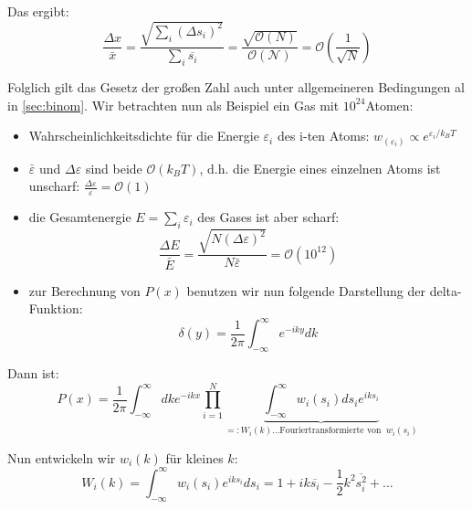 \documentclass[ngerman]{scrartcl}
\begin{document}
	Das ergibt:
	\begin{equation}
		\frac{\Delta x}{\bar{x}}=\frac{\sqrt{\sum_i(\Delta s_i)^2}}{\sum_i \overline{s_i}}=
		\frac{\sqrt{\mathcal{O}(N)}}{\mathcal{O(N)}}=\mathcal{O}\left(\frac{1}{\sqrt{N}}\right)
	\end{equation}
	
	Folglich gilt das Gesetz der großen Zahl auch unter allgemeineren Bedingungen al in \autoref{sec:binom}. Wir betrachten nun als Beispiel ein Gas mit $10^{24}$Atomen:
	\begin{itemize}
		\item Wahrscheinlichkeitsdichte für die Energie $\varepsilon_i$ des i-ten Atoms: $w_(\varepsilon_i) \propto e^{\varepsilon_i / k_B T}$
		\item $\bar{\varepsilon}$ und $\Delta \varepsilon$ sind beide $\mathcal{O}(k_B T)$, d.h. die Energie eines einzelnen Atoms ist unscharf: $\frac{\Delta \varepsilon}{\varepsilon} = \mathcal{O}(1)$
		\item die Gesamtenergie $E=\sum_i \varepsilon_i$ des Gases ist aber scharf: \begin{equation}\frac{\Delta E}{\bar{E}}=\frac{\sqrt{N(\Delta\varepsilon)^2}}{N\bar{\varepsilon}}=\mathcal{O}(10^{12})\end{equation}
		\item zur Berechnung von $P(x)$ benutzen wir nun folgende Darstellung der delta-Funktion:\begin{equation} \delta (y) = \frac{1}{2\pi} \int_{-\infty}^{\infty} e^{-iky}dk \end{equation}
\end{itemize}
	
	Dann ist:
	\begin{equation}
		P(x)=\frac{1}{2\pi}\int_{-\infty}^{\infty}dke^{-ikx} \prod_{i=1}^N \underbrace{\int_{-\infty}^{\infty} w_i(s_i)ds_i e^{iks_i}	}_{=:W_i(k)\dots \text{Fouriertransformierte von }~w_i(s_i)}
	\end{equation}
	
	Nun entwickeln wir $w_i(k)$ für kleines $k$:
	\begin{equation}
		W_i(k)=\int_{-\infty}^{\infty}w_i(s_i)e^{iks_i}ds_i = 1+ ik \overline{s_i} - \frac{1}{2}k^2 \overline{s_i^2} + \ldots
	\end{equation}
	
	\newpage
	\thispagestyle{plain}
	\printbibliography
	
\end{document}

